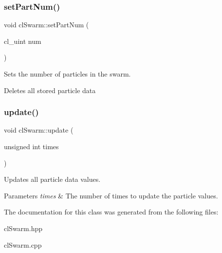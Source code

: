 \subsubsection{\texorpdfstring{set\+Part\+Num()}{setPartNum()}}
{\footnotesize\ttfamily void cl\+Swarm\+::set\+Part\+Num (\begin{DoxyParamCaption}\item[{cl\+\_\+uint}]{num }\end{DoxyParamCaption})}



Sets the number of particles in the swarm. 

Deletes all stored particle data \mbox{\label{classclSwarm_a189bdd39fc8333496c2c96b6944bd995}} 
\subsubsection{\texorpdfstring{update()}{update()}}
{\footnotesize\ttfamily void cl\+Swarm\+::update (\begin{DoxyParamCaption}\item[{unsigned int}]{times }\end{DoxyParamCaption})}



Updates all particle data values. 


\begin{DoxyParams}{Parameters}
{\em times} & The number of times to update the particle values. \\
\hline
\end{DoxyParams}


The documentation for this class was generated from the following files\+:\begin{DoxyCompactItemize}
\item 
cl\+Swarm.\+hpp\item 
cl\+Swarm.\+cpp\end{DoxyCompactItemize}
